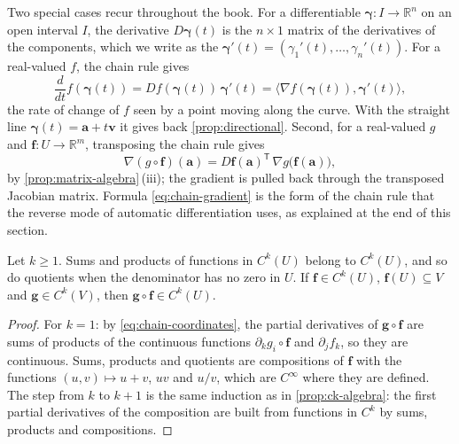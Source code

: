 Two special cases recur throughout the book. For a differentiable  $\boldsymbol\gamma\colon I\to\mathbb R^n$ on an open interval $I$, the derivative $D\boldsymbol\gamma(t)$ is the $n\times1$ matrix of the derivatives of the components, which we write as the  $\boldsymbol\gamma'(t)=(\gamma_1'(t),\ldots,\gamma_n'(t))$. For a real-valued $f$, the chain rule gives
\begin{equation}
\frac d{dt}f(\boldsymbol\gamma(t))=Df(\boldsymbol\gamma(t))\,\boldsymbol\gamma'(t)=\bigl\langle\nabla f(\boldsymbol\gamma(t)),\boldsymbol\gamma'(t)\bigr\rangle ,
\label{eq:chain-curve}
\end{equation}
the rate of change of $f$ seen by a point moving along the curve. With the straight line $\boldsymbol\gamma(t)=\mathbf a+t\mathbf v$ it gives back \cref{prop:directional}. Second, for a real-valued $g$ and $\mathbf f\colon U\to\mathbb R^m$, transposing the chain rule gives
\begin{equation}
\nabla(g\circ\mathbf f)(\mathbf a)=D\mathbf f(\mathbf a)^{\mathsf T}\,\nabla g\bigl(\mathbf f(\mathbf a)\bigr),
\label{eq:chain-gradient}
\end{equation}
by \cref{prop:matrix-algebra}\,(iii); the gradient is pulled back through the transposed Jacobian matrix. Formula \eqref{eq:chain-gradient} is the form of the chain rule that the reverse mode of automatic differentiation uses, as explained at the end of this section.

\begin{corollary}
\label{cor:ck-composition}
Let $k\ge1$. Sums and products of functions in $C^k(U)$ belong to $C^k(U)$, and so do quotients when the denominator has no zero in $U$. If $\mathbf f\in C^k(U)$, $\mathbf f(U)\subseteq V$ and $\mathbf g\in C^k(V)$, then $\mathbf g\circ\mathbf f\in C^k(U)$.
\end{corollary}

\begin{proof}
For $k=1$: by \eqref{eq:chain-coordinates}, the partial derivatives of $\mathbf g\circ\mathbf f$ are sums of products of the continuous functions $\partial_kg_i\circ\mathbf f$ and $\partial_jf_k$, so they are continuous. Sums, products and quotients are compositions of $\mathbf f$ with the functions $(u,v)\mapsto u+v$, $uv$ and $u/v$, which are $C^\infty$ where they are defined. The step from $k$ to $k+1$ is the same induction as in \cref{prop:ck-algebra}: the first partial derivatives of the composition are built from functions in $C^k$ by sums, products and compositions.
\end{proof}

